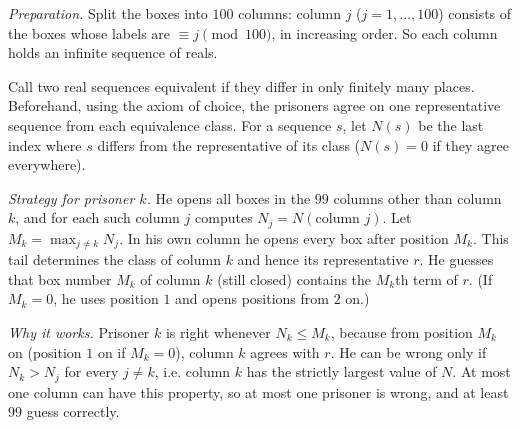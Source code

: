 \emph{Preparation.} Split the boxes into $100$ columns: column $j$ ($j=1,\dots,100$) consists of the boxes whose labels are $\equiv j\pmod{100}$, in increasing order. So each column holds an infinite sequence of reals.

Call two real sequences equivalent if they differ in only finitely many places. Beforehand, using the axiom of choice, the prisoners agree on one representative sequence from each equivalence class. For a sequence $s$, let $N(s)$ be the last index where $s$ differs from the representative of its class ($N(s)=0$ if they agree everywhere).

\emph{Strategy for prisoner $k$.} He opens all boxes in the $99$ columns other than column $k$, and for each such column $j$ computes $N_j=N(\text{column }j)$. Let $M_k=\max_{j\ne k}N_j$. In his own column he opens every box after position $M_k$. This tail determines the class of column $k$ and hence its representative $r$. He guesses that box number $M_k$ of column $k$ (still closed) contains the $M_k$th term of $r$. (If $M_k=0$, he uses position $1$ and opens positions from $2$ on.)

\emph{Why it works.} Prisoner $k$ is right whenever $N_k\le M_k$, because from position $M_k$ on (position $1$ on if $M_k=0$), column $k$ agrees with $r$. He can be wrong only if $N_k>N_j$ for every $j\ne k$, i.e. column $k$ has the strictly largest value of $N$. At most one column can have this property, so at most one prisoner is wrong, and at least $99$ guess correctly.
